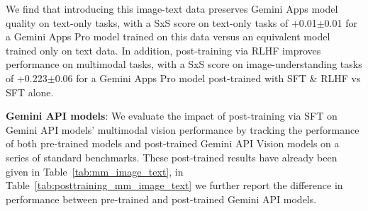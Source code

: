 We find that introducing this image-text data preserves Gemini Apps model quality on text-only tasks, with a SxS score on text-only tasks of +0.01$\pm$0.01 for a Gemini Apps Pro model trained on this data versus an equivalent model trained only on text data. In addition, post-training via RLHF improves performance on multimodal tasks, with a SxS score on image-understanding tasks of +0.223$\pm$0.06 for a Gemini Apps Pro model post-trained with SFT \& RLHF vs SFT alone.

\textbf{Gemini API models}: We evaluate the impact of post-training via SFT on Gemini API models’ multimodal vision performance by tracking the performance of both pre-trained models and post-trained Gemini API Vision models on a series of standard benchmarks. These post-trained results have already been given in Table~\ref{tab:mm_image_text}, in Table~\ref{tab:posttraining_mm_image_text} we further report the difference in performance between  pre-trained and post-trained Gemini API models.

